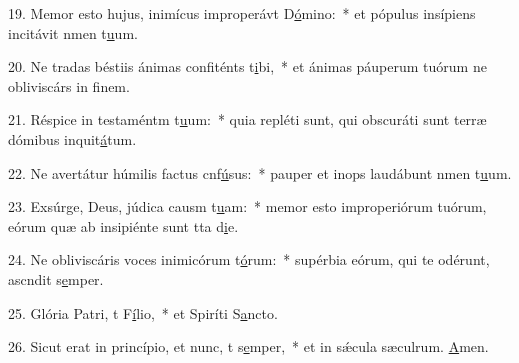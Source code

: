19. Memor esto hujus, inimícus improperávt D\uline{ó}mino:~* et pópulus insípiens incitávit nmen t\uline{u}um.\par 
20. Ne tradas béstiis ánimas confiténts t\uline{i}bi,~* et ánimas páuperum tuórum ne obliviscárs in f\uline{i}nem.\par 
21. Réspice in testaméntm t\uline{u}um:~* quia repléti sunt, qui obscuráti sunt terræ dómibus inquit\uline{á}tum.\par 
22. Ne avertátur húmilis factus cnf\uline{ú}sus:~* pauper et inops laudábunt nmen t\uline{u}um.\par 
23. Exsúrge, Deus, júdica causm t\uline{u}am:~* memor esto improperiórum tuórum, eórum quæ ab insipiénte sunt tta d\uline{i}e.\par 
24. Ne obliviscáris voces inimicórum t\uline{ó}rum:~* supérbia eórum, qui te odérunt, ascndit s\uline{e}mper.\par 
25. Glória Patri, t F\uline{í}lio,~* et Spiríti S\uline{a}ncto.\par 
26. Sicut erat in princípio, et nunc, t s\uline{e}mper,~* et in sǽcula sæculrum. \uline{A}men.\par 
